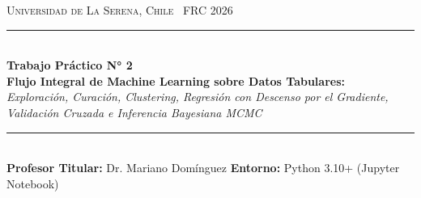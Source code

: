 \documentclass[11pt,a4paper]{article}
\begin{document}
\begin{center}
    {\large\scshape Universidad de La Serena, Chile  \textbar\ FRC 2026}\\[0.2cm]
    {\color{NavyMain}\rule{\textwidth}{2pt}}\\[0.35cm]
    {\huge\bfseries\color{NavyMain} Trabajo Práctico N° 2}\\[0.25cm]
    {\Large\bfseries\color{BlueAccent} Flujo Integral de Machine Learning sobre Datos Tabulares:}\\
    {\large\itshape Exploración, Curación, Clustering, Regresión con Descenso por el Gradiente,\\
    Validación Cruzada e Inferencia Bayesiana MCMC}\\[0.35cm]
    {\color{NavyMain}\rule{\textwidth}{1pt}}\\[0.3cm]
    \textbf{Profesor Titular:} Dr. Mariano Domínguez \quad\textbar\quad
    \textbf{Entorno:} Python 3.10+ (Jupyter Notebook)
\end{center}

\vspace{0.3cm}
\end{document}
